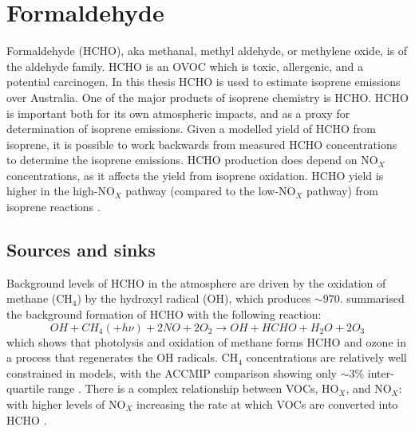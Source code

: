     
\section{Formaldehyde}
\label{LR:HCHO}

  Formaldehyde (HCHO), aka methanal, methyl aldehyde, or methylene oxide, is of the aldehyde family.
  HCHO is an OVOC which is toxic, allergenic, and a potential carcinogen.
  In this thesis HCHO is used to estimate isoprene emissions over Australia.
  One of the major products of isoprene chemistry is HCHO.
  HCHO is important both for its own atmospheric impacts, and as a proxy for determination of isoprene emissions.
  Given a modelled yield of HCHO from isoprene, it is possible to work backwards from measured HCHO concentrations to determine the isoprene emissions.
  HCHO production does depend on NO$_X$ concentrations, as it affects the yield from isoprene oxidation.
  HCHO yield is higher in the high-NO$_X$ pathway (compared to the low-NO$_X$ pathway) from isoprene reactions \parencite{Marais2012}.
  
  

  
  \subsection{Sources and sinks}
    \label{LR:HCHO:Sources}
     
    Background levels of HCHO in the atmosphere are driven by the oxidation of methane (CH$_4$) by the hydroxyl radical (OH$\dot{}$), which produces $\sim 970$\tgpyr \parencite{FortemsCheiney2012}.
    \textcite{Atkinson2000} summarised the background formation of HCHO with the following reaction:
    \begin{equation*} \label{LR:HCHO:Sources:eqn_MethaneBackground}
      OH + CH_4 (+ h\nu) + 2NO + 2O_2 \rightarrow OH + HCHO + H_2O + 2O_3
    \end{equation*}
    which shows that photolysis and oxidation of methane forms HCHO and ozone in a process that regenerates the OH radicals.
    CH$_4$ concentrations are relatively well constrained in models, with the ACCMIP comparison showing only $\sim3$\% inter-quartile range \parencite{Young2013}.
    There is a complex relationship between VOCs, HO$_X$, and NO$_X$: with higher levels of NO$_X$ increasing the rate at which VOCs are converted into HCHO \parencite{Wolfe2016}.
    
